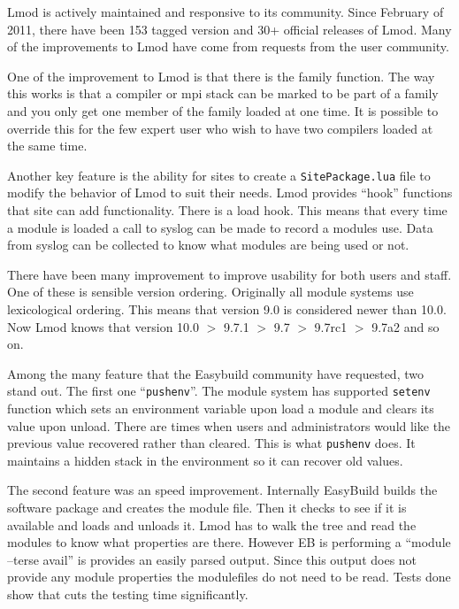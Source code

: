 Lmod is actively maintained and responsive to its community.  Since
February of 2011, there have been 153 tagged version and 30+ official
releases of Lmod.  Many of the improvements to Lmod have come from
requests from the user community.  

One of the improvement to Lmod is that there is the family function.
The way this works is that a compiler or mpi stack can be marked to be
part of a family and you only get one member of the family loaded at
one time.  It is possible to override this for the few expert user who
wish to have two compilers loaded at the same time.

Another key feature is the ability for sites to create a
\texttt{SitePackage.lua} file to modify the behavior of Lmod to suit
their needs.  Lmod provides ``hook'' functions that site can add
functionality.  There is a load hook.  This means that
every time a module is loaded a call to syslog can be
made to record a modules use.  Data from syslog can be collected to
know what modules are being used or not.

There have been many improvement to improve usability for both users
and staff.  One of these is sensible version ordering.  Originally all
module systems use lexicological ordering.  This means that version
9.0 is considered newer than 10.0.  Now Lmod knows that version 10.0 $>$
9.7.1 $>$ 9.7 $>$ 9.7rc1 $>$ 9.7a2 and so on.

Among the many feature that the Easybuild community have requested,
two stand out.  The first one ``\texttt{pushenv}''.  The module system
has supported \texttt{setenv} function which sets an environment variable 
upon load a module and clears its value upon unload.  There are times
when users and administrators would like the previous value recovered
rather than cleared.  This is what \texttt{pushenv} does.  It
maintains a hidden stack in the environment so it can recover old
values.

The second feature was an speed improvement.  Internally EasyBuild
builds the software package and creates the module file.  Then it
checks to see if it is available and loads and unloads it.  Lmod has
to walk the tree and read the modules to know what properties are
there. However EB is performing a ``module --terse avail'' is provides
an easily parsed output.  Since this output does not provide any
module properties the modulefiles do not need to be read.  Tests done
show that cuts the testing time significantly.

